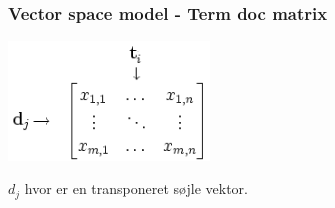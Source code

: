 \documentclass[xcolor=table]{beamer}
\begin{document}
\begin{frame}
\begin{center}
  \end{center}

\end{frame}






\begin{frame}

  \frametitle{Vector space model - Term doc matrix}


  \begin{center}
    \includegraphics[width=0.40\textwidth]{diagram/termdoc}
  \end{center}

  $d_j$ hvor er en transponeret s\o jle vektor.

\end{frame}
\end{document}
